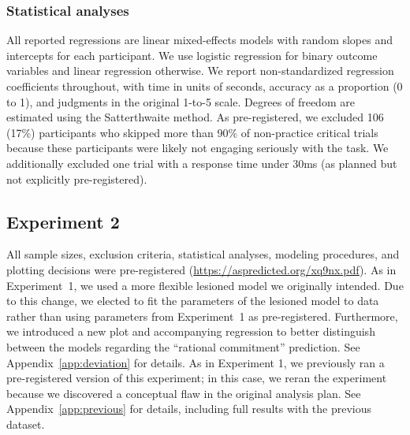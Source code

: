 
\subsubsection{Statistical analyses}

All reported regressions are linear mixed-effects models with random slopes and intercepts for each participant. We use logistic regression for binary outcome variables and linear regression otherwise. We report non-standardized regression coefficients throughout, with time in units of seconds, accuracy as a proportion (0 to 1), and judgments in the original 1-to-5 scale. Degrees of freedom are estimated using the Satterthwaite method. As pre-registered, we excluded 106 (17\%) participants who skipped more than 90\% of non-practice critical trials because these participants were likely not engaging seriously with the task. We additionally excluded one trial with a response time under 30ms (as planned but not explicitly pre-registered).

\subsection{Experiment 2}\label{sec:memory-methods2}

All sample sizes, exclusion criteria, statistical analyses, modeling procedures, and plotting decisions were pre-registered (\url{https://aspredicted.org/xq9nx.pdf}). As in Experiment~1, we used a more flexible lesioned model we originally intended. Due to this change, we elected to fit the parameters of the lesioned model to data rather than using parameters from Experiment~1 as pre-registered. Furthermore, we introduced a new plot and accompanying regression to better distinguish between the models regarding the ``rational commitment'' prediction. See Appendix~\ref{app:deviation} for details. As in Experiment 1, we previously ran a pre-registered version of this experiment; in this case, we reran the experiment because we discovered a conceptual flaw in the original analysis plan. See Appendix~\ref{app:previous} for details, including full results with the previous dataset.

